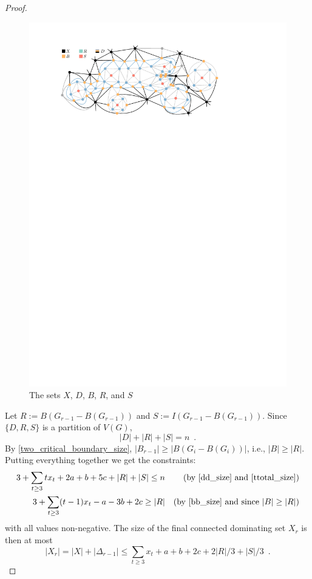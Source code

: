 \documentclass{article}
\theoremstyle{definition}
\begin{document}
\begin{proof}
  \begin{figure}
      \centering
      \includegraphics{figs/dbrs}
      \caption{The sets $X$, $D$, $B$, $R$, and $S$}
      \label{dbrs}
  \end{figure}

  Let $R:=B(G_{r-1}-B(G_{r-1}))$ and $S:=I(G_{r-1}-B(G_{r-1}))$.  Since $\{D,R,S\}$ is a partition of $V(G)$,
  \begin{equation}
    |D|+|R|+|S|= n \enspace . \label{ttotal_size}
  \end{equation}
  By \cref{two_critical_boundary_size}, $|B_{r-1}|\ge |B(G_i-B(G_i))|$, i.e., $|B|\ge |R|$.  Putting everything together we get the constraints:
  \begin{align}
        3 + \sum_{t\ge 3}tx_t + 2a + b + 5c + |R| + |S| \le n&
          & \text{(by \cref{dd_size} and \cref{ttotal_size})}  \label{a} \\
        3 + \sum_{t\ge 3}(t-1)x_t - a - 3b + 2c \ge |R|
          & & \text{(by \cref{bb_size} and since $|B|\ge |R|$)} \label{b} \\
  \end{align}
  with all values non-negative.  The size of the final connected dominating set $X_r$ is then at most
  \begin{equation}
    |X_r| = |X| + |\Delta_{r-1}| \le \sum_{t\ge 3}x_t + a + b + 2c + 2|R|/3 + |S|/3  \enspace . \label{oobjective}
  \end{equation}


\end{proof}
\end{document}
